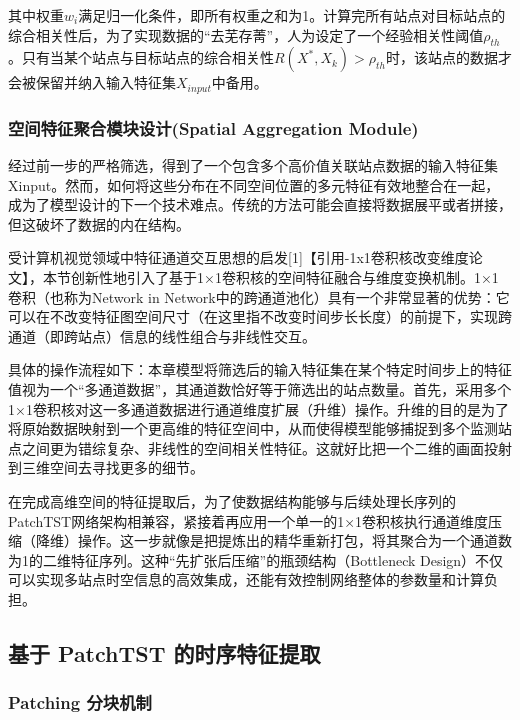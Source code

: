 
其中权重$w_i$满足归一化条件，即所有权重之和为1。计算完所有站点对目标站点的综合相关性后，为了实现数据的“去芜存菁”，人为设定了一个经验相关性阈值$\rho_{th}$。只有当某个站点与目标站点的综合相关性$R(X^*, X_k) > \rho_{th}$时，该站点的数据才会被保留并纳入输入特征集$X_{input}$中备用。


\subsubsection{空间特征聚合模块设计(Spatial Aggregation Module)}


经过前一步的严格筛选，得到了一个包含多个高价值关联站点数据的输入特征集Xinput。然而，如何将这些分布在不同空间位置的多元特征有效地整合在一起，成为了模型设计的下一个技术难点。传统的方法可能会直接将数据展平或者拼接，但这破坏了数据的内在结构。

受计算机视觉领域中特征通道交互思想的启发[1]【引用-1x1卷积核改变维度论文】，本节创新性地引入了基于1×1卷积核的空间特征融合与维度变换机制。1×1卷积（也称为Network in Network中的跨通道池化）具有一个非常显著的优势：它可以在不改变特征图空间尺寸（在这里指不改变时间步长长度）的前提下，实现跨通道（即跨站点）信息的线性组合与非线性交互。

具体的操作流程如下：本章模型将筛选后的输入特征集在某个特定时间步上的特征值视为一个“多通道数据”，其通道数恰好等于筛选出的站点数量。首先，采用多个1×1卷积核对这一多通道数据进行通道维度扩展（升维）操作。升维的目的是为了将原始数据映射到一个更高维的特征空间中，从而使得模型能够捕捉到多个监测站点之间更为错综复杂、非线性的空间相关性特征。这就好比把一个二维的画面投射到三维空间去寻找更多的细节。

在完成高维空间的特征提取后，为了使数据结构能够与后续处理长序列的PatchTST网络架构相兼容，紧接着再应用一个单一的1×1卷积核执行通道维度压缩（降维）操作。这一步就像是把提炼出的精华重新打包，将其聚合为一个通道数为1的二维特征序列。这种“先扩张后压缩”的瓶颈结构（Bottleneck Design）不仅可以实现多站点时空信息的高效集成，还能有效控制网络整体的参数量和计算负担。


\subsection{基于 PatchTST 的时序特征提取}

\subsubsection{Patching 分块机制}

